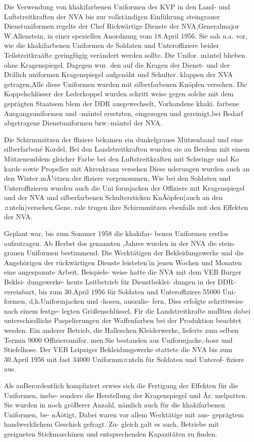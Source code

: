 Die Verwendung von khakifarbenen Uniformen
der KVP in den Land- und Luftstreitkraften der
NVA bis zur vollständigen Einführung steingrauer
Dienstuniformen regelte der Chef Rickwärtige
Dienste der NVA,Generalmajor W.Allenstein, in
einer speziellen Anordnung vom 18.April 1956. Sie
sah u.a. vor, wie die khakifarbenen Uniformen de
Soldaten und Unteroffiziere beider Teilstreitkraäfte
geringfügig verändert werden sollte. Die Unifor.
mäntel blieben ohne Kragenspiegel. Dagegen wur.
den auf die Kragen der Dienst- und der Drillich
uniformen Kragenspiegel aufgenäht und Schulter.
klappen der NVA getragen,Alle diese Uniformen
wurden mit silberfarbenen Knöpfen versehen. Dic
Koppelschlösser der Lederkoppel wurden schritt
weise gegen solche mit dem geprägten Staatsem
blem der DDR ausgewechselt, Vorhandene khaki.
farbene Ausgangsuniformen und -mäntel ersetzten,
eingezogen und gereinigt,bei Bedarf abgetragene
Dienstuniformen bzw.-mäntel der NVA.

Die Schirmmützen der ffiziere bekamen ein
dunkelgraues Mützenband und eine silberfarbené
Kordel, Bei den Landstreitkraften wurden sie au
Berdem mit einem Mützenemblem gleicher Farbe
bei den Luftstreitkraften mit Schwinge und Ko
karde sowie Propeller mit Ahrenkranz versehen
Diese nderungen wurden auch an den Winter
mÃ¼tzen der ffiziere vorgenommen, Wie bei den
Soldaten und Unteroffizieren wurden auch die Uni
formjacken der Offiziere mit Kragenspiegel und
der NVA und silberfarbenen
Schultersticken
KnÃöpfen(auch an den ¤nteln)versehen.Gene.
rale trugen ihre Schirmmützen ebenfalls mit den
Effekten der NVA.

Geplant war, bis zum Sommer 1958 die khakifar-
benen Uniformen restlos aufzutragen. Ab Herbst
des genannten ,Jahres wurden in der NVA die stein-
grauen Uniformen bestimmend. Die Werktätigen
der Bekleidungswerke und die Angehörigen der
rückwärtigen Dienste leisteten'in jenen Wochen
und Monaten eine angespannte Arbeit, Beispiels-
weise hatte die NVA mit dem VEB Burger Beklei-
dungswerke- heute Leitbetrieb für Dienstbeklei-
dungen in der DDR- vereinbart, bis zum 30.April
1956 für Soldaten und Unteroffiziere 55000 Uni-
formen, d,h.Uniformjacken und -hosen, auszulie-
fern, Dies erfolgte schrittweise nach einem festge-
legten Größenschlüssel, Fir die Landstreitkrafte
muBten dabei unterschiedliche Paspelierungen der Waffenfarben bei der Produktion beachtet werden.
Ein anderer Betrieb, die Halleschen Kleiderwerke,
lieferte zum selben Termin 9000 Offiziersunifor.
men.Sie bestanden aus Uniformjacke,-hose und
Stiefelhose. Der VEB Leipziger Bekleidungswerke
stattete die NVA bis zum 30.April 1956 mit fast
34000 Uniformm¤nteln für Soldaten und Unterof-
fiziere aus.

Als auBerordentlich kompliziert erwies sich die
Fertigung der Effekten für die Uniformen, insbe-
sondere die Herstellung der Kragenspiegel und Ãr.
melpatten. Sie wurden in noch gröBerer Anzahl,
nämlich auch für die khakifarbenen Uniformen, be-
nÃötigt, Dabei waren vor allem Werktätige mit aus-
geprägtem handwerklichem Geschick gefragt. Zu-
gleich galt es auch, Betriebe mit
geeigneten
Stickmaschinen und entsprechenden Kapazitäten
zu finden.